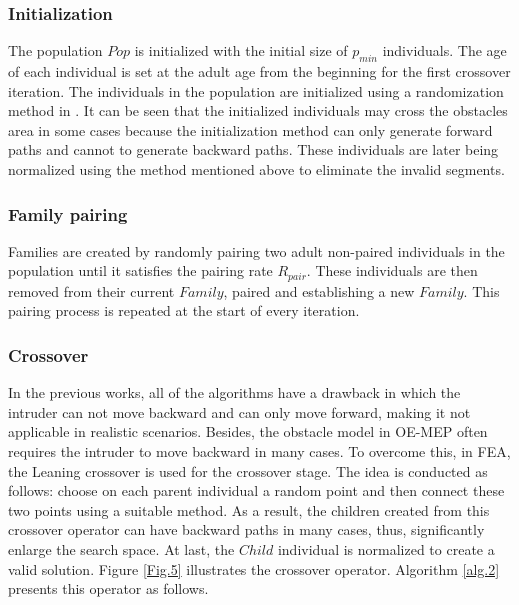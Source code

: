 \documentclass[final]{elsarticle}
\begin{document}
\subsubsection{Initialization}

The population $Pop$ is initialized with the initial size of $p_{min}$ individuals. The age of each individual is set at the adult age from the beginning for the first crossover iteration. The individuals in the population are initialized using a randomization method in \cite{binh2019efficient}. It can be seen that the initialized individuals may cross the obstacles area in some cases because the initialization method can only generate forward paths and cannot to generate backward paths. These individuals are later being normalized using the method mentioned above to eliminate the invalid segments.

\subsubsection{Family pairing}

Families are created by randomly pairing two adult non-paired individuals in the population until it satisfies the pairing rate $R_{pair}$. These individuals are then removed from their current $ Family $, paired and establishing a new $Family$. This pairing process is repeated at the start of every iteration.

\subsubsection{Crossover}

In the previous works, all of the algorithms have a drawback in which the intruder can not move backward and can only move forward, making it not applicable in realistic scenarios. Besides, the obstacle model in OE-MEP often requires the intruder to move backward in many cases. To overcome this, in FEA, the Leaning crossover is used for the crossover stage. The idea is conducted as follows: choose on each parent individual a random point and then connect these two points using a suitable method. As a result, the children created from this crossover operator can have backward paths in many cases, thus, significantly enlarge the search space. At last, the $Child$ individual is normalized to create a valid solution. Figure \ref{Fig.5} illustrates the crossover operator. Algorithm \ref{alg.2} presents this operator as follows.
\end{document}
